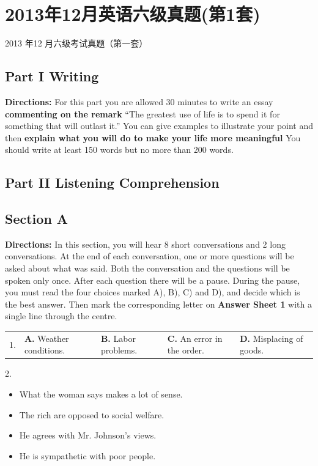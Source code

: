 \documentclass[UTF8,11pt]{ctexart}
\begin{document}
\section*{2013年12月英语六级真题(第1套)}
2013 年12 月六级考试真题（第一套）


\subsection*{\textbf{Part I} \textbf{Writing}}


\textbf{Directions:} For this part you are allowed 30 minutes to write an essay\textbf{ commenting on the remark} “The greatest use of life is to spend it for something that will outlast it.” You can give examples to illustrate your point and then \textbf{explain what you will do to make your life more meaningful} You should write at least 150 words but no more than 200 words.


\subsection*{\textbf{Part} II \textbf{Listening Comprehension}}


\subsection*{Section A}


\textbf{Directions:} In this section, you will hear 8 short conversations and 2 long conversations. At the end of each conversation, one or more questions will be asked about what was said. Both the conversation and the questions will be spoken only once. After each question there will be a pause. During the pause, you must read the four choices marked A), B), C) and D), and decide which is the best answer. Then mark the corresponding letter on\textbf{ Answer Sheet 1} with a single line through the centre.


\noindent\begin{tabularx}{\linewidth}{@{}lXXXX@{}}1. & \textbf{A.} Weather conditions. & \textbf{B.} Labor problems. & \textbf{C.} An error in the order. & \textbf{D.} Misplacing of goods.\\\end{tabularx}\par

2.


\begin{itemize}[leftmargin=2em,itemsep=.2em,topsep=.4em]\item[A.] What the woman says makes a lot of sense.
\item[B.] The rich are opposed to social welfare.
\item[C.] He agrees with Mr. Johnson’s views.
\item[D.] He is sympathetic with poor people.
\end{itemize}
\end{document}
